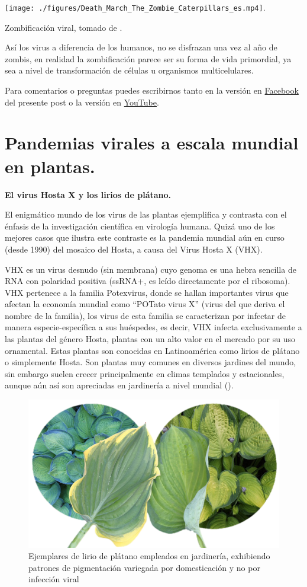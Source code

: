 \documentclass[
  12pt, krantz2,
  spanish,
]{krantz}
\begin{document}
\texttt{[image: ./figures/Death\_March\_The\_Zombie\_Caterpillars\_es.mp4]}.

Zombificación viral, tomado de \citet{youtube}.

Así los virus a diferencia de los humanos, no se disfrazan una vez al año de zombis, en realidad la zombificación parece ser su forma de vida primordial, ya sea a nivel de transformación de células u organismos multicelulares.

Para comentarios o preguntas puedes escribirnos tanto en la versión en \href{https://www.facebook.com/BioViral/posts/284936346967015}{Facebook} del presente post o la versión en \href{https://www.youtube.com/watch?v=Taqv4eFDtpo}{YouTube}.

\hypertarget{plantPand}{%
\section{Pandemias virales a escala mundial en plantas.}\label{plantPand}}

\textbf{El virus Hosta X y los lirios de plátano.}

El enigmático mundo de los virus de las plantas ejemplifica y contrasta con el énfasis de la investigación científica en virología humana. Quizá uno de los mejores casos que ilustra este contraste es la pandemia mundial aún en curso (desde 1990) del mosaico del Hosta, a causa del Virus Hosta X (VHX).

VHX es un virus desnudo (sin membrana) cuyo genoma es una hebra sencilla de RNA con polaridad positiva (ssRNA+, es leído directamente por el ribosoma). VHX pertenece a la familia Potexvirus, donde se hallan importantes virus que afectan la economía mundial como ``POTato virus X'' (virus del que deriva el nombre de la familia), los virus de esta familia se caracterizan por infectar de manera especie-específica a sus huéspedes, es decir, VHX infecta exclusivamente a las plantas del género Hosta, plantas con un alto valor en el mercado por su uso ornamental. Estas plantas son conocidas en Latinoamérica como lirios de plátano o simplemente Hosta. Son plantas muy comunes en diversos jardines del mundo, sin embargo suelen crecer principalmente en climas templados y estacionales, aunque aún así son apreciadas en jardinería a nivel mundial (\citet{baker2013hosta}).

\begin{figure}
\includegraphics[width=0.6\linewidth]{figures/hosta_patterns} \caption{Ejemplares de lirio de plátano empleados en jardinería, exhibiendo patrones de pigmentación variegada por domesticación y no por infección viral}\label{fig:hosta}
\end{figure}
\end{document}
